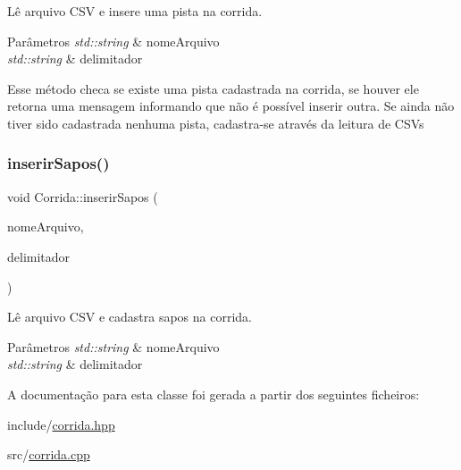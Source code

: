 Lê arquivo C\+SV e insere uma pista na corrida. 


\begin{DoxyParams}{Parâmetros}
{\em std\+::string} & nome\+Arquivo \\
\hline
{\em std\+::string} & delimitador\\
\hline
\end{DoxyParams}
Esse método checa se existe uma pista cadastrada na corrida, se houver ele retorna uma mensagem informando que não é possível inserir outra. Se ainda não tiver sido cadastrada nenhuma pista, cadastra-\/se através da leitura de C\+SV\textquotesingle{}s \mbox{\label{classCorrida_aee79fcba9ecca389b2e31f517490fc73}} 
\subsubsection{\texorpdfstring{inserir\+Sapos()}{inserirSapos()}}
{\footnotesize\ttfamily void Corrida\+::inserir\+Sapos (\begin{DoxyParamCaption}\item[{std\+::string}]{nome\+Arquivo,  }\item[{std\+::string}]{delimitador }\end{DoxyParamCaption})}



Lê arquivo C\+SV e cadastra sapos na corrida. 


\begin{DoxyParams}{Parâmetros}
{\em std\+::string} & nome\+Arquivo \\
\hline
{\em std\+::string} & delimitador \\
\hline
\end{DoxyParams}


A documentação para esta classe foi gerada a partir dos seguintes ficheiros\+:\begin{DoxyCompactItemize}
\item 
include/\hyperlink{corrida_8hpp}{corrida.\+hpp}\item 
src/\hyperlink{corrida_8cpp}{corrida.\+cpp}\end{DoxyCompactItemize}
